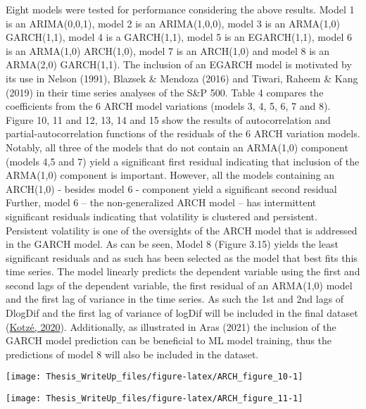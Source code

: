 \documentclass[11pt,preprint, authoryear]{elsarticle}
\let\origfigure\figure
\let\endorigfigure\endfigure
\renewenvironment{figure}[1][2] {
    \expandafter\origfigure\expandafter[H]
} {
    \endorigfigure
}
\numberwithin{equation}{section}
\numberwithin{figure}{section}
\numberwithin{table}{section}
\begin{document}
Eight models were tested for performance considering the above results.
Model 1 is an ARIMA(0,0,1), model 2 is an ARIMA(1,0,0), model 3 is an
ARMA(1,0) GARCH(1,1), model 4 is a GARCH(1,1), model 5 is an
EGARCH(1,1), model 6 is an ARMA(1,0) ARCH(1,0), model 7 is an ARCH(1,0)
and model 8 is an ARMA(2,0) GARCH(1,1). The inclusion of an EGARCH model
is motivated by its use in Nelson (1991), Blazsek \& Mendoza (2016) and
Tiwari, Raheem \& Kang (2019) in their time series analyses of the S\&P
500. Table 4 compares the coefficients from the 6 ARCH model variations
(models 3, 4, 5, 6, 7 and 8). Figure 10, 11 and 12, 13, 14 and 15 show
the results of autocorrelation and partial-autocorrelation functions of
the residuals of the 6 ARCH variation models. Notably, all three of the
models that do not contain an ARMA(1,0) component (models 4,5 and 7)
yield a significant first residual indicating that inclusion of the
ARMA(1,0) component is important. However, all the models containing an
ARCH(1,0) - besides model 6 - component yield a significant second
residual Further, model 6 -- the non-generalized ARCH model -- has
intermittent significant residuals indicating that volatility is
clustered and persistent. Persistent volatility is one of the oversights
of the ARCH model that is addressed in the GARCH model. As can be seen,
Model 8 (Figure 3.15) yields the least significant residuals and as such
has been selected as the model that best fits this time series. The
model linearly predicts the dependent variable using the first and
second lags of the dependent variable, the first residual of an
ARMA(1,0) model and the first lag of variance in the time series. As
such the 1st and 2nd lags of DlogDif and the first lag of variance of
logDif will be included in the final dataset
(\protect\hyperlink{ref-kotze2020univariate}{Kotzé, 2020}).
Additionally, as illustrated in Aras (2021) the inclusion of the GARCH
model prediction can be beneficial to ML model training, thus the
predictions of model 8 will also be included in the dataset.

\begin{figure}[H]

{\centering \texttt{[image: Thesis\_WriteUp\_files/figure-latex/ARCH\_figure\_10-1]} 

}

\caption{Autocorrelation and partial-autocorrelation functions of model 3 - ARMA(1,0) GARCH(1,1) - residuals \label{Figure9}}\label{fig:ARCH_figure_10}
\end{figure}

\begin{figure}[H]

{\centering \texttt{[image: Thesis\_WriteUp\_files/figure-latex/ARCH\_figure\_11-1]} 

}

\caption{Autocorrelation and partial-autocorrelation functions of model 4 - GARCH(1,1) -  residuals \label{Figure9}}\label{fig:ARCH_figure_11}
\end{figure}
\end{document}
